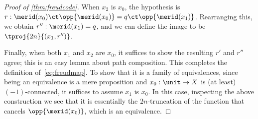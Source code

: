 \begin{proof}[Proof of \cref{thm:freudcode}]
  When $x_2$ is $x_0$, the hypothesis is $r:\merid(x_0)\ct \opp{\merid(x_0)} = q \ct \opp{\merid(x_1)}$.
  Rearranging this, we obtain $r'':\merid(x_1)=q$, and we can define the image to be $\tproj{2n}{(x_1,r'')}$.

  Finally, when both $x_1$ and $x_2$ are $x_0$, it suffices to show the resulting $r'$ and $r''$ agree; this is an easy lemma about path composition.
  This completes the definition of~\eqref{eq:freudmap}.
  To show that it is a family of equivalences, since being an equivalence is a mere proposition and $x_0:\unit\to X$ is (at least) $(-1)$-connected, it suffices to assume $x_1$ is $x_0$.
  In this case, inspecting the above construction we see that it is essentially the $2n$-truncation of the function that cancels $\opp{\merid(x_0)}$, which is an equivalence.
\end{proof}
